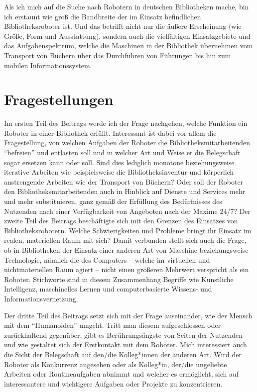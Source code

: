 \documentclass[a4paper,
fontsize=11pt,
oneside,
numbers=noperiodatend,
parskip=half-,
bibliography=totoc,
final
]{scrartcl}
\begin{document}
Als ich mich auf die Suche nach Robotern in deutschen Bibliotheken
mache, bin ich erstaunt wie groß die Bandbreite der im Einsatz
befindlichen Bibliotheksroboter ist. Und das betrifft nicht nur die
äußere Erscheinung (wie Größe, Form und Ausstattung), sondern auch die
vielfältigen Einsatzgebiete und das Aufgabenspektrum, welche die
Maschinen in der Bibliothek übernehmen vom Transport von Büchern über
das Durchführen von Führungen bis hin zum mobilen Informationssystem.

\hypertarget{fragestellungen}{%
\section{Fragestellungen}\label{fragestellungen}}

Im ersten Teil des Beitrags werde ich der Frage nachgehen, welche
Funktion ein Roboter in einer Bibliothek erfüllt. Interessant ist dabei
vor allem die Fragestellung, von welchen Aufgaben der Roboter die
Bibliotheksmitarbeitenden \enquote{befreien} und entlasten soll und in
welcher Art und Weise er die Belegschaft sogar ersetzen kann oder soll.
Sind dies lediglich monotone beziehungsweise iterative Arbeiten wie
beispielsweise die Bibliotheksinventur und körperlich anstrengende
Arbeiten wie der Transport von Büchern? Oder soll der Roboter den
Bibliotheksmitarbeitenden auch in Hinblick auf Dienste und Services mehr
und mehr substituieren, ganz gemäß der Erfüllung des Bedürfnisses des
Nutzenden nach einer Verfügbarkeit von Angeboten nach der Maxime 24/7?
Der zweite Teil des Beitrags beschäftigte sich mit den Grenzen des
Einsatzes von Bibliotheksrobotern. Welche Schwierigkeiten und Probleme
bringt ihr Einsatz im realen, materiellen Raum mit sich? Damit verbunden
stellt sich auch die Frage, ob in Bibliotheken der Einsatz einer anderen
Art von Maschine beziehungsweise Technologie, nämlich die des Computers
-- welche im virtuellen und nichtmateriellen Raum agiert -- nicht einen
größeren Mehrwert verspricht als ein Roboter. Stichworte sind in diesem
Zusammenhang Begriffe wie Künstliche Intelligenz, maschinelles Lernen
und computerbasierte Wissens- und Informationsvernetzung.

Der dritte Teil des Beitrags setzt sich mit der Frage auseinander, wie
der Mensch mit dem \enquote{Humanoiden} umgeht. Tritt man diesem
aufgeschlossen oder zurückhaltend gegenüber, gibt es Berührungsängste
von Seiten der Nutzenden und wie gestaltet sich der Erstkontakt mit dem
Roboter. Mich interessiert auch die Sicht der Belegschaft auf den/die
Kolleg*innen der anderen Art. Wird der Roboter als Konkurrenz angesehen
oder als Kolleg*in, der/die ungeliebte Arbeiten oder Routineaufgaben
abnimmt und welcher es ermöglicht, sich auf interessantere und
wichtigere Aufgaben oder Projekte zu konzentrieren.
\end{document}
